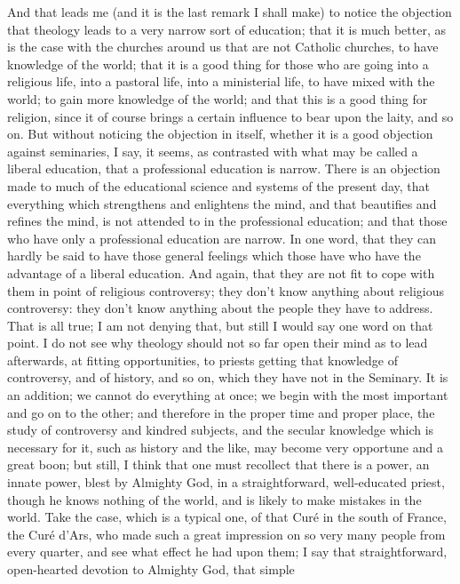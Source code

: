 And that leads me (and it is the last remark I shall make) to
notice the objection that theology leads to a very narrow sort of
education; that it is much better, as is the case with the churches
around us that are not Catholic churches, to have knowledge of the
world; that it is a good thing for those who are going into a
religious life, into a pastoral life, into a ministerial life, to have
mixed with the world; to gain more knowledge of the world; and
that this is a good thing for religion, since it of course brings a
certain influence to bear upon the laity, and so on. But without
noticing the objection in itself, whether it is a good objection
against seminaries, I say, it seems, as contrasted with what may be
called a liberal education, that a professional education is narrow.
There is an objection made to much of the educational science and
systems of the present day, that everything which strengthens and
enlightens the mind, and that beautifies and refines the mind, is not
attended to in the professional education; and that those who have
only a professional education are narrow. In one word, that they can
hardly be said to have those general feelings which those have who
have the advantage of a liberal education. And again, that they are
not fit to cope with them in point of religious controversy; they don't
know anything about religious controversy: they don't know anything
about the people they have to address. That is all true; I am not
denying that, but still I would say one word on that point. I do not
see why theology should not so far open their mind as to lead
afterwards, at fitting opportunities, to priests getting that
knowledge of controversy, and of history, and so on, which they have
not in the Seminary. It is an addition; we cannot do everything at
once; we begin with the most important and go on to the other; and
therefore in the proper time and proper place, the study of
controversy and kindred subjects, and the secular knowledge which is
necessary for it, such as history and the like, may become very
opportune and a great boon; but still, I think that one must recollect
that there is a power, an innate power, blest by Almighty God, in a
straightforward, well-educated priest, though he knows nothing of the
world, and is likely to make mistakes in the world. Take the case,
which is a typical one, of that Curé in the south of France, the
Curé d'Ars, who made such a great impression on so very many people
from every quarter, and see what effect he had upon them; I say that
straightforward, open-hearted devotion to Almighty God, that simple
